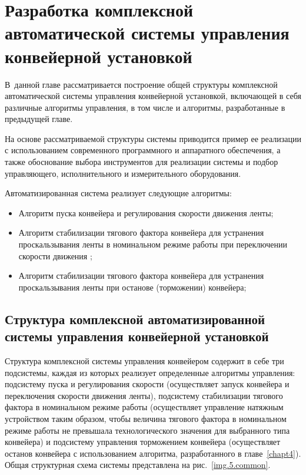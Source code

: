 
\chapter{Разработка комплексной автоматической системы управления конвейерной установкой} \label{chapt5}
В~данной главе рассматривается построение общей структуры комплексной автоматической системы управления конвейерной установкой, включающей в себя различные алгоритмы управления, в том числе и алгоритмы, разработанные в предыдущей главе. 

На основе рассматриваемой структуры системы приводится пример ее реализации с использованием современного программного и аппаратного обеспечения, а также обоснование выбора инструментов для реализации системы и подбор управляющего, исполнительного и измерительного оборудования.

Автоматизированная система реализует следующие алгоритмы:
\begin{itemize}
\item Алгоритм пуска конвейера и регулирования скорости движения ленты;
\item Алгоритм стабилизации тягового фактора конвейера для устранения проскальзывания ленты в номинальном режиме работы при переключении скорости движения \cite{vdmitrieva};
\item Алгоритм стабилизации тягового фактора конвейера для устранения проскальзывания ленты при останове (торможении) конвейера;
\end{itemize}

\section{Структура комплексной автоматизированной системы управления конвейерной установкой} \label{sect5_1}

Структура комплексной системы управления конвейером содержит в себе три подсистемы, каждая из которых реализует определенные алгоритмы управления: подсистему пуска и регулирования скорости (осуществляет запуск конвейера и переключения скорости движения ленты), подсистему стабилизации тягового фактора в номинальном режиме работы (осуществляет управление натяжным устройством таким образом, чтобы величина тягового фактора в номинальном режиме работы не превышала технологического значения для выбранного типа конвейера) и подсистему управления торможением конвейера (осуществляет останов конвейера с использованием алгоритма, разработанного в главе~\ref{chapt4}). Общая структурная схема системы представлена на рис.~\ref{img.5.common}.


